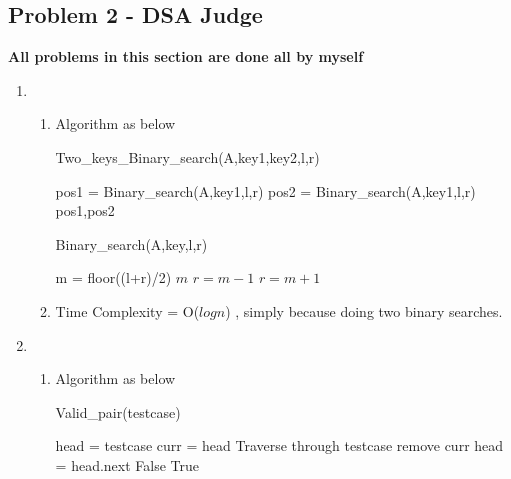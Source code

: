 \documentclass{article}
\begin{document}
\begin{CJK*}{UTF8}{bsmi}
\section{Problem 2 - DSA Judge}
\textbf{All problems in this section are done all by myself}
\begin{enumerate}
    \item \begin{enumerate}
        \item Algorithm as below
        \begin{algorithm}[H]
        \caption{Two\_keys\_Binary\_search(A,key1,key2,l,r)}
        \begin{algorithmic}
        \State pos1 = Binary\_search(A,key1,l,r)
        \State pos2 = Binary\_search(A,key1,l,r) \\
        \Return pos1,pos2
        \end{algorithmic}
        \end{algorithm}
        \begin{algorithm} [H]
        \caption{Binary\_search(A,key,l,r)}
        \begin{algorithmic}
        \State m = floor((l+r)/2)
        \If{$A[m-1] < key < A[m]]$} 
            \State \Return $m$
            \State $r = m-1$
            \State $r = m+1$
        \EndIf
        \EndWhile
        \end{algorithmic}
        \end{algorithm}
    \item Time Complexity = O($log{n}$) , simply because doing two binary searches.
    \end{enumerate}
    
    \item \begin{enumerate}
        \item Algorithm as below
        \begin{algorithm} [H]
        \caption{Valid\_pair(testcase)}
        \begin{algorithmic}
        \State head = testcase
        \State curr = head
        \State Traverse through testcase
            \State remove curr 
            \State head = head.next
        \EndIf
        \State \Return False
        \EndIf
        \EndWhile
        \State \Return True
        \end{algorithmic}
        \end{algorithm}
        

\end{enumerate}
\end{enumerate}
\end{CJK*}
\end{document}
